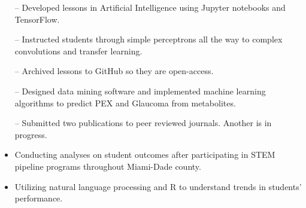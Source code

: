\documentclass[10pt,letter]{altacv}
\begin{document}
\begin{itemize}
    \setlength{\itemindent}{0.5em}
    \item[--]   \small{Developed lessons in Artificial Intelligence using Jupyter notebooks and TensorFlow.}
     \item[--] \small {Instructed students through simple perceptrons all the way to complex convolutions and transfer learning.}
    \item[--]   \small{Archived lessons to GitHub so they are open-access.}
   
\end{itemize}

\medskip




\begin{itemize}
    \setlength{\itemindent}{0.5em}
    \item[--]   \small{Designed data mining software and implemented machine learning algorithms to predict PEX and Glaucoma from metabolites.}
    \item[--]   \small{Submitted two publications to peer reviewed journals. Another is in progress.}
\end{itemize}

\medskip






\begin{itemize}
  \item Conducting analyses on student outcomes after participating in STEM pipeline programs throughout Miami-Dade county. 
  \item Utilizing natural language processing and R to understand trends in students' performance. 
\end{itemize}
\end{document}
